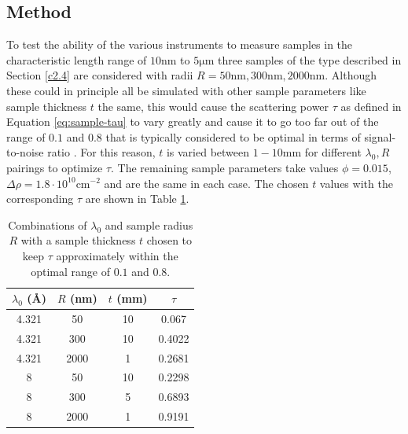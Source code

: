 \documentclass{article}
\begin{document}

\subsection{Method}
To test the ability of the various instruments to measure samples in the characteristic length range of $10 \unit{\nano\meter}$ to $5 \unit{\micro\meter}$ three samples of the type described in Section \ref{c2.4} are considered with radii $R = 50\unit{\nano\meter}, 300\unit{\nano\meter}, 2000\unit{\nano\meter}$. Although these could in principle all be simulated with other sample parameters like sample thickness $t$ the same, this would cause the scattering power $\tau$ as defined in Equation \eqref{eq:sample-tau} to vary greatly and cause it to go too far out of the range of $0.1$ and $0.8$ that is typically considered to be optimal in terms of signal-to-noise ratio \cite{bouwman2021b}\cite{heijkamp2011}. For this reason, $t$ is varied between $1 - 10\unit{\milli\meter}$ for different $\lambda_0, R$ pairings to optimize $\tau$. The remaining sample parameters take values $\phi = 0.015$, $\Delta\rho = 1.8\cdot 10^{10} \unit{\centi\meter}^{-2}$ and are the same in each case. The chosen $t$ values with the corresponding $\tau$ are shown in Table \ref{tab:sample-thickness}.


\begin{table}[h!]
	\centering
	\begin{tabular}{|c|c|c|c|}
		\hline
		$\lambda_0$ (Å)  & $R$ (nm)  & $t$ (mm)& $\tau$ \\
		\hline
		4.321 & 50 & 10 & 0.067\\
		4.321 & 300 & 10 & 0.4022 \\
		4.321 & 2000 & 1 & 0.2681 \\
		8 & 50 & 10 & 0.2298 \\
		8 & 300 & 5 & 0.6893 \\
		8 & 2000 & 1 & 0.9191 \\
		\hline
	\end{tabular}
	\caption{Combinations of $\lambda_0$ and sample radius $R$ with a sample thickness $t$ chosen to keep $\tau$ approximately within the optimal range of $0.1$ and $0.8$.}
	\label{tab:sample-thickness}
\end{table}
\end{document}
